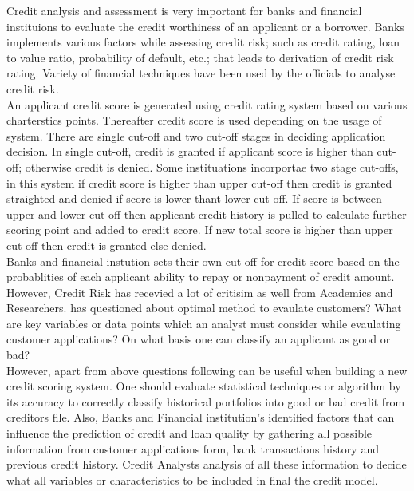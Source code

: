 {Credit analysis and assessment is very important for banks and financial instituions to evaluate the credit worthiness of an applicant or a borrower. Banks implements various factors while assessing credit risk; such as credit rating, loan to value ratio, probability of default, etc.; that leads to derivation of credit risk rating. Variety of financial techniques have been used by the officials to analyse credit risk.\\

An applicant credit score is generated using credit rating system based on various charterstics points. Thereafter credit score is used depending on the usage of system. There are single cut-off and two cut-off stages in deciding application decision. In single cut-off, credit is granted if applicant score is higher than cut-off; otherwise credit is denied. Some instituations incorportae two stage cut-offs, in this system if credit score is higher than upper cut-off then credit is granted straighted and denied if score is lower thant lower cut-off. If score is between upper and lower cut-off then applicant credit history is pulled to calculate further scoring point and added to credit score. If new total score is higher than upper cut-off then credit is granted else denied.\\

Banks and financial instution sets their own cut-off for credit score based on the probablities of each applicant ability to repay or nonpayment of credit amount.\\

However, Credit Risk has recevied a lot of critisim as well from Academics and Researchers. \citet{al2002credit} has questioned about optimal method to evaulate customers? What are key variables or data points which an analyst must consider while evaulating customer applications? On what basis one can classify an applicant as good or bad?\\

However, apart from above questions following can be useful when building a new credit scoring system. One should evaluate statistical techniques or algorithm by its accuracy to correctly classify historical portfolios into good or bad credit from creditors file. Also, Banks and Financial institution's identified factors that can influence the prediction of credit and loan quality by gathering all possible information from customer applications form, bank transactions history and previous credit history. Credit Analysts analysis of all these information to decide what all variables or characteristics to be included in final the credit model.\\

}
